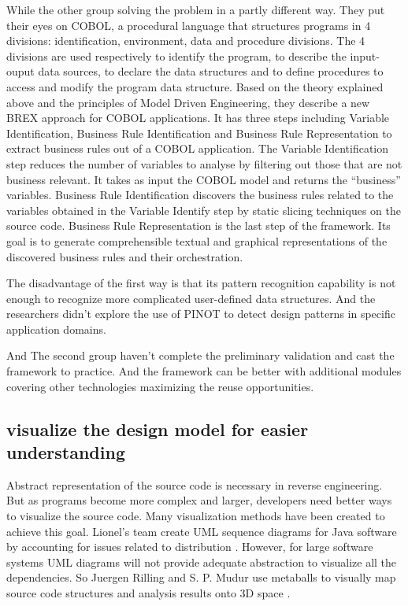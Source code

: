 \documentclass[acmsmall]{acmart}
\begin{document}
While the other group solving the problem in a partly different way\cite{2014Extracting}. They put their eyes on COBOL, a procedural language that structures programs in 4 divisions: identification, environment, data and procedure divisions. The 4 divisions are used respectively to identify the program, to describe the input-ouput data sources, to declare the data structures and to define procedures to access and modify the program data structure. Based on the theory explained above and the principles of Model Driven Engineering, they describe a new BREX approach for COBOL applications. It has three steps including Variable Identification, Business Rule Identification and Business Rule Representation to extract business rules out of a COBOL application. The Variable Identification step reduces the number of variables to analyse by filtering out those that are not business relevant. It takes as input the COBOL model and returns the “business” variables. Business Rule Identification discovers the business rules related to the variables obtained in the Variable Identify step by static slicing techniques on the source code. Business Rule Representation is the last step of the framework. Its goal is to generate comprehensible textual and graphical representations of the discovered business rules and their orchestration.


The disadvantage of the first way is that its pattern recognition capability is not enough to recognize more complicated user-defined data structures. And the researchers didn’t explore the use of PINOT to detect design patterns in specific application domains.

And The second group haven’t complete the preliminary validation and cast the framework to practice. And the framework can be better with additional modules covering other technologies maximizing the reuse opportunities.


\subsection{visualize the design model for easier understanding}
Abstract representation of the source code is necessary in reverse engineering. But as programs become more complex and larger, developers need better ways to visualize the source code. Many visualization methods have been created to achieve this goal. Lionel's team create UML sequence diagrams for Java software by accounting for issues related to distribution \cite{2006Toward}. However, for large software systems UML diagrams will not provide adequate abstraction to visualize all the dependencies. So Juergen Rilling and S. P. Mudur use metaballs to visually map source code structures and analysis results onto 3D space \cite{2002On}.
\end{document}
